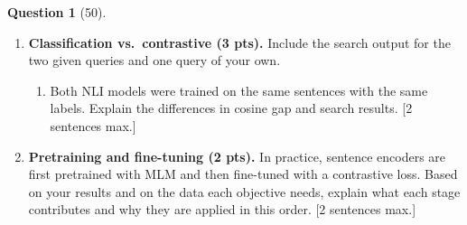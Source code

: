 \documentclass[12pt]{article}
\theoremstyle{definition}
\newtheorem{exercise}{Question}
\begin{document}
\begin{exercise}[50]
{\begin{enumerate}[label=\textbf{2.3.\arabic*}, leftmargin=*]
  \item \textbf{Classification vs.\ contrastive (3 pts).} Include the search output for the two given queries and
  one query of your own.
  \begin{enumerate}[label=(\alph*)]
    \item Both NLI models were trained on the same sentences with the same labels. Explain the differences in cosine gap and search results. [2 sentences max.]
  \end{enumerate}

  \item \textbf{Pretraining and fine-tuning (2 pts).} In practice, sentence encoders are first pretrained with MLM
  and then fine-tuned with a contrastive loss. Based on your results and on the data each objective needs, explain
  what each stage contributes and why they are applied in this order. [2 sentences max.]
\end{enumerate}
}
\end{exercise}
\end{document}
